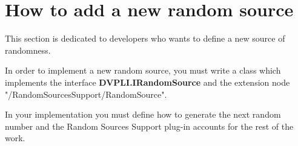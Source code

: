 \section{How to add a new random source}
\label{sec.dev}
This section is dedicated to developers who wants to define a new source of randomness.

In order to implement a new random source, you must write a
class which implements the interface \textbf{DVPLI.IRandomSource} and the extension node "/RandomSourcesSupport/RandomSource". 

In your implementation you must define how to generate the next random number and the Random Sources Support plug-in accounts for the rest of the work.






